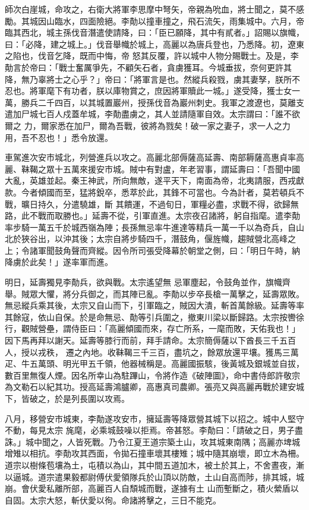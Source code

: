 \begin{pinyinscope}
 師次白崖城，命攻之，右衛大將軍李思摩中弩矢，帝親為吮血，將士聞之，莫不感勵。其城因山臨水，四面險絕。李勣以撞車撞之，飛石流矢，雨集城中。六月，帝臨其西北，城主孫伐音潛遣使請降，曰：「臣已願降，其中有貳者。」詔賜以旗幟，曰：「必降，建之城上。」伐音舉幟於城上，高麗以為唐兵登也，乃悉降。初，遼東之陷也，伐音乞降，既而中悔，帝
 怒其反覆，許以城中人物分賜戰士。及是，李勣言於帝曰：「戰士奮厲爭先，不顧矢石者，貪虜獲耳。今城垂拔，奈何更許其降，無乃辜將士之心乎？」帝曰：「將軍言是也。然縱兵殺戮，虜其妻孥，朕所不忍也。將軍麾下有功者，朕以庫物賞之，庶因將軍贖此一城。」遂受降，獲士女一萬，勝兵二千四百，以其城置巖州，授孫伐音為巖州刺史。我軍之渡遼也，莫離支遣加尸城七百人戍蓋牟城，李勣盡虜之，其人並請隨軍自效。太宗謂曰：「誰不欲爾之
 力，爾家悉在加尸，爾為吾戰，彼將為戮矣！破一家之妻子，求一人之力用，吾不忍也！」悉令放還。



 車駕進次安市城北，列營進兵以攻之。高麗北部傉薩高延壽、南部耨薩高惠貞率高麗、靺鞨之眾十五萬來援安市城。賊中有對盧，年老習事，謂延壽曰：「吾聞中國大亂，英雄並起。秦王神武，所向無敵，遂平天下，南面為帝，北夷請服，西戎獻款。今者傾國而至，猛將銳卒，悉萃於此，其鋒不可當也。今為計者，莫若頓兵不戰，曠日持久，分遣驍雄，斷
 其饋運，不過旬日，軍糧必盡，求戰不得，欲歸無路，此不戰而取勝也。」延壽不從，引軍直進。太宗夜召諸將，躬自指麾。遣李勣率步騎一萬五千於城西嶺為陣；長孫無忌率牛進達等精兵一萬一千以為奇兵，自山北於狹谷出，以沖其後；太宗自將步騎四千，潛鼓角，偃旌幟，趨賊營北高峰之上；令諸軍聞鼓角聲而齊縱。因令所司張受降幕於朝堂之側，曰：「明日午時，納降虜於此矣！」遂率軍而進。



 明日，延壽獨見李勣兵，欲與戰。太宗遙望無
 忌軍塵起，令鼓角並作，旗幟齊舉。賊眾大懼，將分兵御之，而其陣已亂。李勣以步卒長槍一萬擊之，延壽眾敗。無忌縱兵乘其後，太宗又自山而下，引軍臨之，賊因大潰，斬首萬餘級。延壽等率其餘寇，依山自保。於是命無忌、勣等引兵圍之，撤東川梁以斷歸路。太宗按轡徐行，觀賊營壘，謂侍臣曰：「高麗傾國而來，存亡所系，一麾而敗，天佑我也！」因下馬再拜以謝天。延壽等膝行而前，拜手請命。太宗簡傉薩以下酋長三千五百人，授以戎秩，
 遷之內地。收靺鞨三千三百，盡坑之，餘眾放還平壤。獲馬三萬疋、牛五萬頭、明光甲五千領，他器械稱是。高麗國振駭，後黃城及銀城並自拔，數百里無復人煙。因名所幸山為駐蹕山，令將作造《破陣圖》，命中書侍郎許敬宗為文勒石以紀其功。授高延壽鴻臚卿，高惠真司農卿。張亮又與高麗再戰於建安城下，皆破之，於是列長圍以攻焉。



 八月，移營安市城東，李勣遂攻安市，擁延壽等降眾營其城下以招之。城中人堅守不動，每見太宗
 旄麾，必乘城鼓噪以拒焉。帝甚怒。李勣曰：「請破之日，男子盡誅。」城中聞之，人皆死戰。乃令江夏王道宗築土山，攻其城東南隅；高麗亦埤城增雉以相抗。李勣攻其西面，令拋石撞車壞其樓雉；城中隨其崩壞，即立木為柵。道宗以樹條苞壤為土，屯積以為山，其中間五道加木，被土於其上，不舍晝夜，漸以逼城。道宗遣果毅都尉傅伏愛領隊兵於山頂以防敵，土山自高而陟，排其城，城崩。會伏愛私離所部，高麗百人自頹城而戰，遂據有土
 山而塹斷之，積火縈盾以自固。太宗大怒，斬伏愛以徇。命諸將擊之，三日不能克。




\end{pinyinscope}

